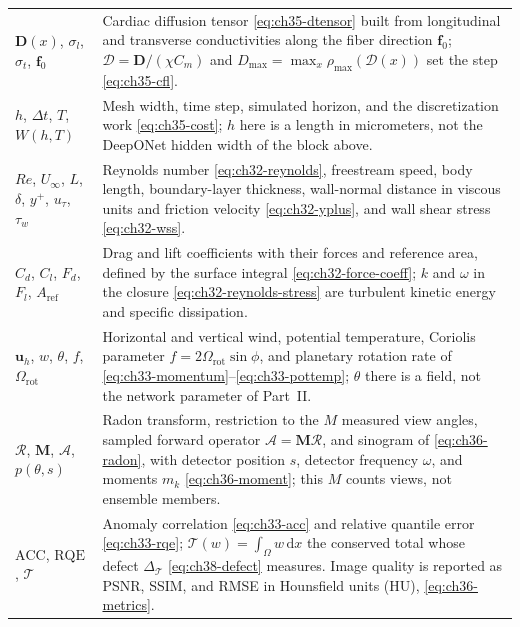 {\begin{xltabular}{\textwidth}{@{}l>{\raggedright\arraybackslash}X@{}}
$\mathbf{D}(x)$, $\sigma_l$, $\sigma_t$, $\mathbf{f}_0$ & Cardiac diffusion tensor \eqref{eq:ch35-dtensor} built from longitudinal and transverse conductivities along the fiber direction $\mathbf{f}_0$; $\mathcal{D} = \mathbf{D}/(\chi C_m)$ and $D_{\max} = \max_x \rho_{\max}(\mathcal{D}(x))$ set the step \eqref{eq:ch35-cfl}. \\
$h$, $\Delta t$, $T$, $W(h,T)$ & Mesh width, time step, simulated horizon, and the discretization work \eqref{eq:ch35-cost}; $h$ here is a length in micrometers, not the DeepONet hidden width of the block above. \\
$Re$, $U_\infty$, $L$, $\delta$, $y^{+}$, $u_\tau$, $\tau_w$ & Reynolds number \eqref{eq:ch32-reynolds}, freestream speed, body length, boundary-layer thickness, wall-normal distance in viscous units and friction velocity \eqref{eq:ch32-yplus}, and wall shear stress \eqref{eq:ch32-wss}. \\
$C_d$, $C_l$, $F_d$, $F_l$, $A_{\text{ref}}$ & Drag and lift coefficients with their forces and reference area, defined by the surface integral \eqref{eq:ch32-force-coeff}; $k$ and $\omega$ in the closure \eqref{eq:ch32-reynolds-stress} are turbulent kinetic energy and specific dissipation. \\
$\mathbf{u}_h$, $w$, $\theta$, $f$, $\Omega_{\text{rot}}$ & Horizontal and vertical wind, potential temperature, Coriolis parameter $f = 2\Omega_{\text{rot}}\sin\phi$, and planetary rotation rate of \eqref{eq:ch33-momentum}--\eqref{eq:ch33-pottemp}; $\theta$ there is a field, not the network parameter of Part~II. \\
$\mathcal{R}$, $\mathbf{M}$, $\mathcal{A}$, $p(\theta,s)$ & Radon transform, restriction to the $M$ measured view angles, sampled forward operator $\mathcal{A} = \mathbf{M}\mathcal{R}$, and sinogram of \eqref{eq:ch36-radon}, with detector position $s$, detector frequency $\omega$, and moments $m_k$ \eqref{eq:ch36-moment}; this $M$ counts views, not ensemble members. \\
$\mathrm{ACC}$, $\mathrm{RQE}$, $\mathcal{T}$ & Anomaly correlation \eqref{eq:ch33-acc} and relative quantile error \eqref{eq:ch33-rqe}; $\mathcal{T}(w) = \int_\Omega w\,\mathrm{d}x$ the conserved total whose defect $\Delta_{\mathcal{T}}$ \eqref{eq:ch38-defect} measures. Image quality is reported as PSNR, SSIM, and RMSE in Hounsfield units (HU), \eqref{eq:ch36-metrics}. \\
\end{xltabular}
}

